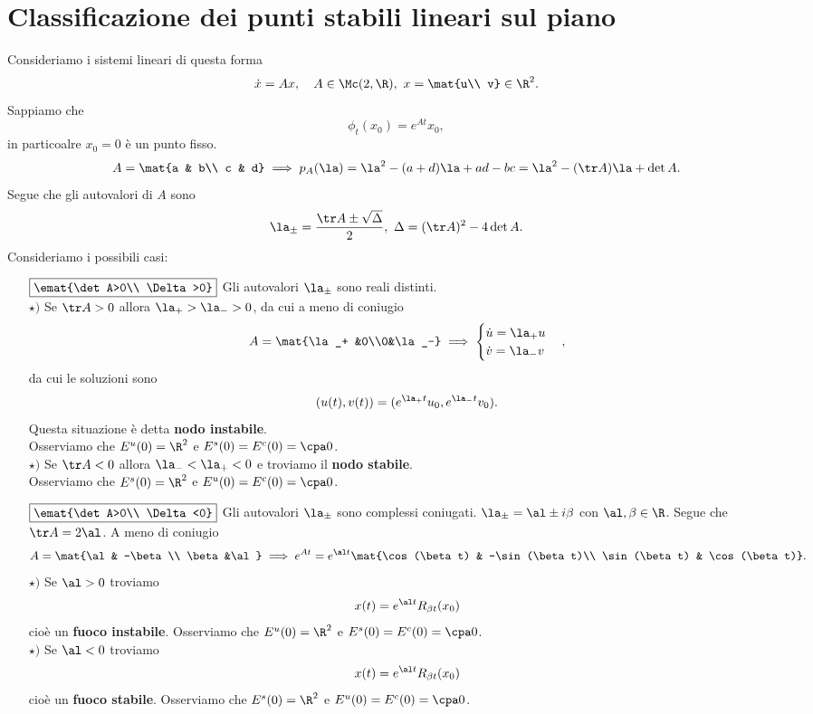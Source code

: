 \section{Classificazione dei punti stabili lineari sul piano}
Consideriamo i sistemi lineari di questa forma
\[\dot x=Ax,\quad A\in\Mc(2,\R),\ x=\mat{u\\ v}\in\R^2.\]
Sappiamo che
\[\phi_t(x_0)=e^{At}x_0,\]
in particoalre $x_0=0$ \`e un punto fisso.
\[A=\mat{a & b\\ c & d}\implies p_A(\la)=\la^2-(a+d)\la+ad-bc=\la^2-(\tr A)\la+\det A.\]
Segue che gli autovalori di $A$ sono
\[\la_{\pm}=\frac{\tr A\pm \sqrt{\Delta}}{2},\ \Delta=(\tr A)^2-4\det A.\]
Consideriamo i possibili casi:
\setlength{\leftmargini}{0cm}
\begin{itemize}
\item[$\boxed{\emat{\det A>0\\ \Delta>0}}$] Gli autovalori $\la_\pm$ sono reali distinti.\\
$\star)$ Se $\tr A>0$ allora $\la_+>\la_->0$, da cui a meno di coniugio
\[A=\mat{\la_+ &0\\0&\la_-}\implies \begin{cases}
\dot u=\la_+ u\\
\dot v=\la_- v
\end{cases},\]
da cui le soluzioni sono
\[(u(t), v(t))=(e^{\la_+t}u_0, e^{\la_-t}v_0).\]
Questa situazione \`e detta \textbf{nodo instabile}.\\ Osserviamo che $E^u(0)=\R^2$ e $E^s(0)=E^c(0)=\cpa0$.\\
$\star)$ Se $\tr A<0$ allora $\la_-<\la_+<0$ e troviamo il \textbf{nodo stabile}.\\ Osserviamo che $E^s(0)=\R^2$ e $E^u(0)=E^c(0)=\cpa0$.
\item[$\boxed{\emat{\det A>0\\ \Delta<0}}$] Gli autovalori $\la_\pm$ sono complessi coniugati. $\la_\pm=\al\pm i\beta$ con $\al,\beta\in\R$. Segue che $\tr A=2\al$. A meno di coniugio
\[A=\mat{\al & -\beta\\ \beta &\al}\implies e^{At}=e^{\al t}\mat{\cos(\beta t) & -\sin(\beta t)\\ \sin(\beta t) & \cos(\beta t)}.\]
$\star)$ Se $\al>0$ troviamo
\[x(t)=e^{\al t} R_{\beta t}(x_0)\]
cio\`e un \textbf{fuoco instabile}. Osserviamo che $E^u(0)=\R^2$ e $E^s(0)=E^c(0)=\cpa0$.\\
$\star)$ Se $\al<0$ troviamo
\[x(t)=e^{\al t} R_{\beta t}(x_0)\]
cio\`e un \textbf{fuoco stabile}. Osserviamo che $E^s(0)=\R^2$ e $E^u(0)=E^c(0)=\cpa0$.\\

\end{itemize}

